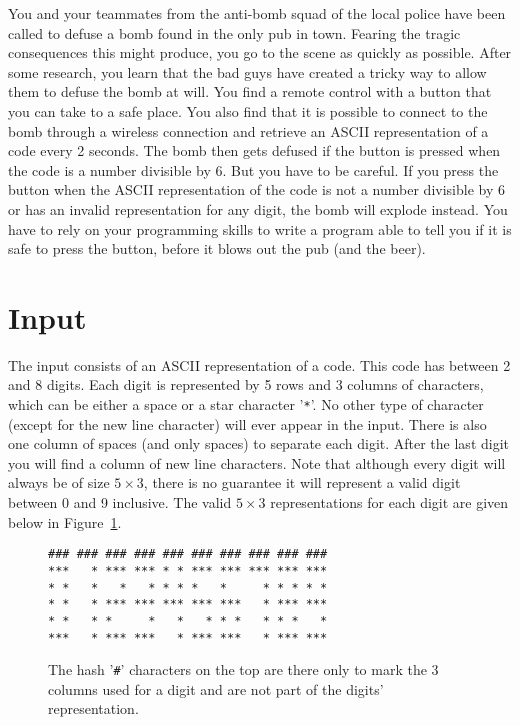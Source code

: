 

You and your teammates from the anti-bomb squad of the local police have been called to
defuse a bomb found in the only pub in town. Fearing the tragic consequences this might
produce, you go to the scene as quickly as possible. After some research, you learn that
the bad guys have created a tricky way to allow them to defuse the bomb at will. You
find a remote control with a button that you can take to a safe place. You also find that
it is possible to connect to the bomb through a wireless connection and retrieve an ASCII
representation of a code every 2 seconds. The bomb then gets defused if the button is
pressed when the code is a number divisible by 6. But you have to be careful. If you press
the button when the ASCII representation of the code is not a number divisible by 6 or has
an invalid representation for any digit, the bomb will explode instead. You have to rely
on your programming skills to write a program able to tell you if it is safe to press the
button, before it blows out the pub (and the beer).

\section*{Input}

The input consists of an ASCII representation of a code. This code has between 2 and 8
digits. Each digit is represented by 5 rows and 3 columns of characters, which can be either
a space or a star character '\texttt{*}'. No other type of character (except for the new line
character) will ever appear in the input. There is also one column of spaces (and only
spaces) to separate each digit. After the last digit you will find a column of new line
characters. Note that although every digit will always be of size $5\times 3$,
there is no guarantee it will represent a valid digit between 0 and 9 inclusive. The valid
$5\times 3$ representations for each digit are given below in Figure~\ref{fig:digits}.

\begin{figure}[h]
  \centering
  \begin{minipage}{0.5\textwidth}
\begin{verbatim}
### ### ### ### ### ### ### ### ### ###
***   * *** *** * * *** *** *** *** ***
* *   *   *   * * * *   *     * * * * *
* *   * *** *** *** *** ***   * *** ***
* *   * *     *   *   * * *   * * *   *
***   * *** ***   * *** ***   * *** ***
\end{verbatim}
  \end{minipage}
  \caption{The hash '{\tt \#}' characters on the top are there only to mark the 3 columns used for
    a digit and are not part of the digits' representation.}
  \label{fig:digits}
\end{figure}


